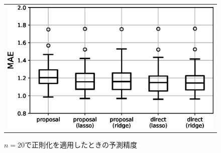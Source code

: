 \begin{figure}[t]
  \centering
    \begin{tabular}{c}
      \includegraphics[width=0.83\hsize]{img/plot3_mod.eps} \\
    \end{tabular}
    \centering
  \caption{$n=20$で正則化を適用したときの予測精度}
  \label{fig:result2}
\end{figure}